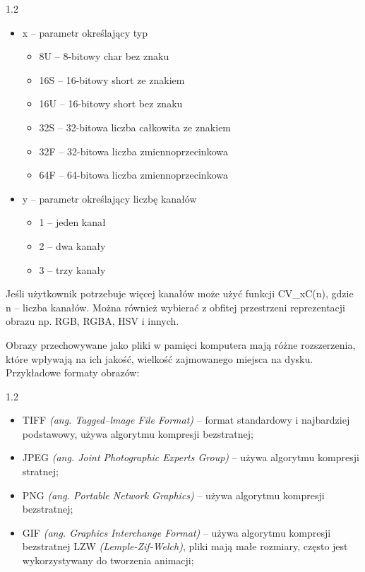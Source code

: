 \documentclass[a4paper,12pt]{article}
\newcommand\spacingInSolemnItemize{1.2}
\begin{document}
				\begin{spacing}{\spacingInSolemnItemize}
					\begin{itemize}
						\item{x -- parametr określający typ}
							\begin{itemize}
								\item{8U -- 8-bitowy char bez znaku}
								\item{16S -- 16-bitowy short ze znakiem}
								\item{16U -- 16-bitowy short bez znaku}
								\item{32S -- 32-bitowa liczba całkowita ze znakiem}
								\item{32F -- 32-bitowa liczba zmiennoprzecinkowa}
								\item{64F -- 64-bitowa liczba zmiennoprzecinkowa}
							\end{itemize}
						\item{y  -- parametr określający liczbę kanałów}
							\begin{itemize}
								\item{1 -- jeden kanał}
								\item{2 -- dwa kanały}
								\item{3 -- trzy kanały}
							\end{itemize}
					\end{itemize}	
				\end{spacing} Jeśli użytkownik potrzebuje więcej kanałów może użyć funkcji CV\_xC(n), gdzie n -- liczba kanałów. Można również wybierać 
				z obfitej przestrzeni reprezentacji obrazu np. RGB, RGBA, HSV i innych. 
			
			 Obrazy przechowywane jako pliki w pamięci komputera mają różne rozszerzenia, które wpływają na ich jakość, 
				wielkość zajmowanego miejsca na dysku. Przykładowe formaty obrazów: 
			
				\begin{spacing}{\spacingInSolemnItemize}
					\begin{itemize}
						\item TIFF \textit{(ang. Tagged--lmage File Format)} -- format standardowy i najbardziej podstawowy, używa algorytmu kompresji bezstratnej;
						\item JPEG \textit{(ang. Joint Photographic Experts Group)} -- używa algorytmu kompresji stratnej;
						\item PNG \textit{(ang. Portable Network Graphics)} -- używa algorytmu kompresji bezstratnej; 
						\item GIF \textit{(ang. Graphics Interchange Format)} -- używa algorytmu kompresji bezstratnej LZW \textit{(Lemple-Zif-Welch)}, 
							pliki mają małe rozmiary, często jest wykorzystywany do tworzenia animacji;
					\end{itemize}
				\end{spacing}
    
\end{document}
